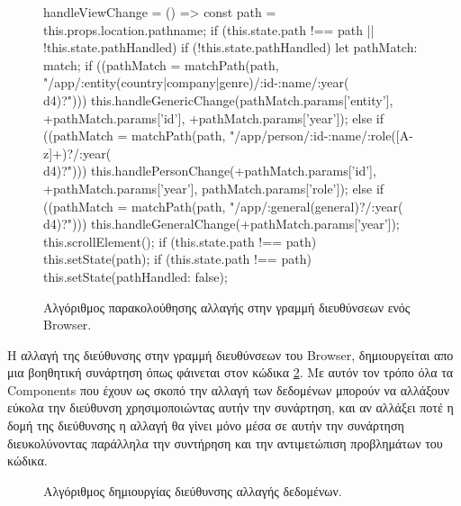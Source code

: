 \begin{figure}[h]
    \begin{TypeScriptcode}
handleViewChange = () => {
    const path = this.props.location.pathname;
    if (this.state.path !== path || !this.state.pathHandled) {
      if (!this.state.pathHandled) {
        let pathMatch: match;
        if ((pathMatch = matchPath(path, "/app/:entity(country|company|genre)/:id-:name/:year(\\d{4})?"))) {
          this.handleGenericChange(pathMatch.params['entity'], +pathMatch.params['id'], +pathMatch.params['year']);
        } else if ((pathMatch = matchPath(path, "/app/person/:id-:name/:role([A-z]+)?/:year(\\d{4})?"))) {
          this.handlePersonChange(+pathMatch.params['id'], +pathMatch.params['year'], pathMatch.params['role']);
        } else if ((pathMatch = matchPath(path, "/app/:general(general)?/:year(\\d{4})?"))) {
          this.handleGeneralChange(+pathMatch.params['year']);
        }
        this.scrollElement();
        if (this.state.path !== path)
          this.setState({path});
      }
      if (this.state.path !== path) {
        this.setState({pathHandled: false});
      }
    }
}
    \end{TypeScriptcode}
    \caption{Αλγόριθμος παρακολούθησης αλλαγής στην γραμμή διευθύνσεων ενός Browser.}
   \label{code:urlIntercept}
\end{figure}

Η αλλαγή της διεύθυνσης στην γραμμή διευθύνσεων του Browser, δημιουργείται απο μια βοηθητική συνάρτηση όπως φάινεται στον κώδικα \ref{code:urlBuilder}. Με αυτόν τον τρόπο όλα τα Components που έχουν ως σκοπό την αλλαγή των δεδομένων μπορούν να αλλάξουν εύκολα την διεύθυνση χρησιμοποιώντας αυτήν την συνάρτηση, και αν αλλάξει ποτέ η δομή της διεύθυνσης η αλλαγή θα γίνει μόνο μέσα σε αυτήν την συνάρτηση διευκολύνοντας παράλληλα την συντήρηση και την αντιμετώπιση προβλημάτων του κώδικα.

\begin{figure}[h]
    \caption{Αλγόριθμος δημιουργίας διεύθυνσης αλλαγής δεδομένων.}
   \label{code:urlBuilder}
\end{figure}

